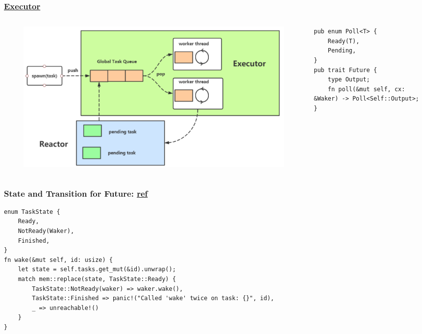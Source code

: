 \begin{frame}[fragile]
    \frametitle{\href{https://juejin.cn/post/6924224793982353415}{Executor}}
    \begin{columns}
        \begin{column}{.5\textwidth}
    \begin{figure}
    \includegraphics[width=0.9\linewidth]{figs/executor.png}
    \end{figure}
        \end{column}
        
        \begin{column}{.5\textwidth}
\small
\begin{block}{} 
    \begin{verbatim}
pub enum Poll<T> {
    Ready(T),
    Pending,
}
pub trait Future {
    type Output;
    fn poll(&mut self, cx: &Waker) -> Poll<Self::Output>;
}
    \end{verbatim}
\end{block}
        \end{column}
    \end{columns}
\end{frame}
\begin{frame}[fragile]
    \frametitle{State and Transition for Future: \href{https://cfsamson.github.io/books-futures-explained/7_finished_example.html}{ref}}
\begin{block}{}
    \begin{verbatim}
enum TaskState {
    Ready,
    NotReady(Waker),
    Finished,
}
fn wake(&mut self, id: usize) {
    let state = self.tasks.get_mut(&id).unwrap();
    match mem::replace(state, TaskState::Ready) {
        TaskState::NotReady(waker) => waker.wake(),
        TaskState::Finished => panic!("Called 'wake' twice on task: {}", id),
        _ => unreachable!()
    }
}  \end{verbatim}
\end{block}
\end{frame}
